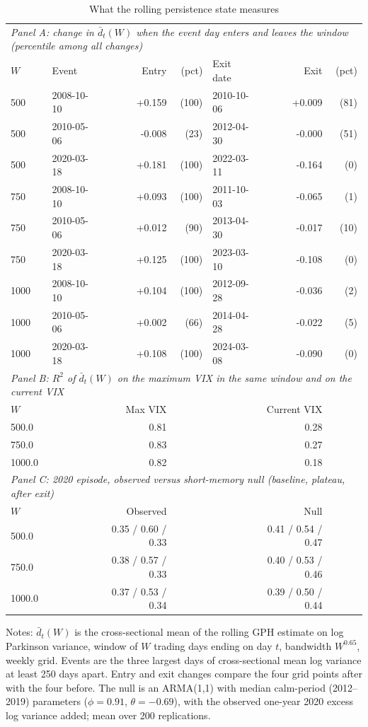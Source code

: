 \begin{table}[htbp]
\centering
\caption{What the rolling persistence state measures}
\label{tab:window_inclusion}
\small
\begin{tabular}{llrrlrr}
\toprule
\multicolumn{7}{l}{\emph{Panel A: change in $\bar d_t(W)$ when the event day enters and leaves the window (percentile among all changes)}}\\
$W$ & Event & Entry & (pct) & Exit date & Exit & (pct) \\
\midrule
500 & 2008-10-10 & +0.159 & (100) & 2010-10-06 & +0.009 & (81) \\
500 & 2010-05-06 & -0.008 & (23) & 2012-04-30 & -0.000 & (51) \\
500 & 2020-03-18 & +0.181 & (100) & 2022-03-11 & -0.164 & (0) \\
750 & 2008-10-10 & +0.093 & (100) & 2011-10-03 & -0.065 & (1) \\
750 & 2010-05-06 & +0.012 & (90) & 2013-04-30 & -0.017 & (10) \\
750 & 2020-03-18 & +0.125 & (100) & 2023-03-10 & -0.108 & (0) \\
1000 & 2008-10-10 & +0.104 & (100) & 2012-09-28 & -0.036 & (2) \\
1000 & 2010-05-06 & +0.002 & (66) & 2014-04-28 & -0.022 & (5) \\
1000 & 2020-03-18 & +0.108 & (100) & 2024-03-08 & -0.090 & (0) \\
\midrule
\multicolumn{7}{l}{\emph{Panel B: $R^2$ of $\bar d_t(W)$ on the maximum VIX in the same window and on the current VIX}}\\
$W$ & & Max VIX & & & Current VIX & \\
\midrule
500.0 & & 0.81 & & & 0.28 & \\
750.0 & & 0.83 & & & 0.27 & \\
1000.0 & & 0.82 & & & 0.18 & \\
\midrule
\multicolumn{7}{l}{\emph{Panel C: 2020 episode, observed versus short-memory null (baseline, plateau, after exit)}}\\
$W$ & & Observed & & & Null & \\
\midrule
500.0 & & 0.35 / 0.60 / 0.33 & & & 0.41 / 0.54 / 0.47 & \\
750.0 & & 0.38 / 0.57 / 0.33 & & & 0.40 / 0.53 / 0.46 & \\
1000.0 & & 0.37 / 0.53 / 0.34 & & & 0.39 / 0.50 / 0.44 & \\
\bottomrule
\end{tabular}
\begin{tablenotes}\small
\item Notes: $\bar d_t(W)$ is the cross-sectional mean of the rolling GPH estimate on log Parkinson variance, window of $W$ trading days ending on day $t$, bandwidth $W^{0.65}$, weekly grid. Events are the three largest days of cross-sectional mean log variance at least 250 days apart. Entry and exit changes compare the four grid points after with the four before. The null is an ARMA(1,1) with median calm-period (2012--2019) parameters ($\phi=0.91$, $\theta=-0.69$), with the observed one-year 2020 excess log variance added; mean over 200 replications.
\end{tablenotes}
\end{table}
